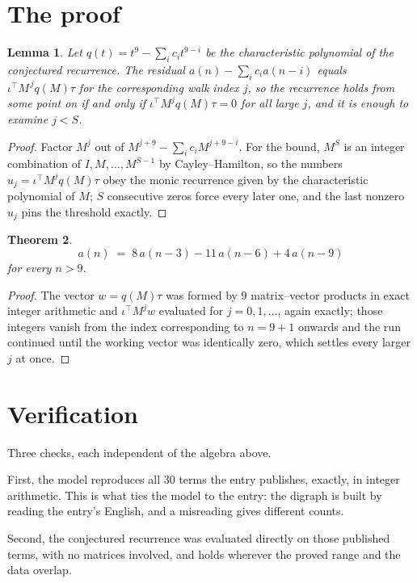 \documentclass[11pt,a4paper]{article}
\theoremstyle{plain}
\newtheorem{theorem}{Theorem}
\newtheorem{lemma}[theorem]{Lemma}
\theoremstyle{definition}
\begin{document}
\section{The proof}

\begin{lemma}\label{lem:crit}
Let $q(t)=t^{9}-\sum_i c_it^{9-i}$ be the characteristic polynomial of the
conjectured recurrence. The residual $a(n)-\sum_ic_ia(n-i)$ equals
$\iota^{\!\top}M^{\,j}q(M)\tau$ for the corresponding walk index $j$, so the recurrence
holds from some point on if and only if $\iota^{\!\top}M^{j}q(M)\tau=0$ for all large $j$,
and it is enough to examine $j<S$.
\end{lemma}

\begin{proof}
Factor $M^{j}$ out of $M^{j+9}-\sum_ic_iM^{j+9-i}$. For the bound, $M^{S}$
is an integer combination of $I,M,\dots,M^{S-1}$ by Cayley--Hamilton, so the numbers
$u_j=\iota^{\!\top}M^{j}q(M)\tau$ obey the monic recurrence given by the characteristic
polynomial of $M$; $S$ consecutive zeros force every later one, and the last nonzero $u_j$
pins the threshold exactly.
\end{proof}

\begin{theorem}
\[
a(n)\;=\;8\,a(n-3) - 11\,a(n-6) + 4\,a(n-9)
\]
for every $n>9$.
\end{theorem}

\begin{proof}
The vector $w=q(M)\tau$ was formed by $9$ matrix--vector products in exact integer
arithmetic and $\iota^{\!\top}M^{j}w$ evaluated for $j=0,1,\dots$, again exactly; those
integers vanish from the index corresponding to $n=9+1$ onwards and the run continued
until the working vector was identically zero, which settles every larger $j$ at once.
\end{proof}

\section{Verification}

Three checks, each independent of the algebra above.

First, the model reproduces all $30$ terms the entry publishes, exactly, in integer
arithmetic. This is what ties the model to the entry: the digraph is built by reading the
entry's English, and a misreading gives different counts.

Second, the conjectured recurrence was evaluated directly on those published terms, with no
matrices involved, and holds wherever the proved range and the data overlap.
\end{document}
